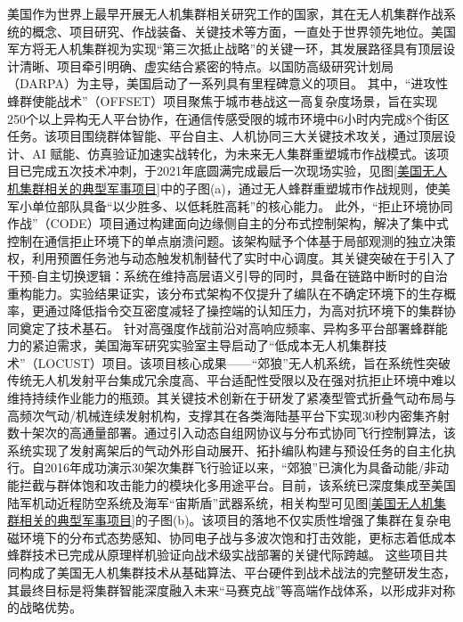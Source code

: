 美国作为世界上最早开展无人机集群相关研究工作的国家，其在无人机集群作战系统的概念、项目研究、作战装备、关键技术等方面，一直处于世界领先地位\cite{WRXT202409001016}。美国军方将无人机集群视为实现“第三次抵止战略”的关键一环，其发展路径具有顶层设计清晰、项目牵引明确、虚实结合紧密的特点\cite{zha2024smart}。以国防高级研究计划局（DARPA）为主导，美国启动了一系列具有里程碑意义的项目\cite{JSWN202005010}。
其中，“进攻性蜂群使能战术”（OFFSET）项目聚焦于城市巷战这一高复杂度场景，旨在实现250个以上异构无人平台协作，在通信传感受限的城市环境中6小时内完成8个街区任务。该项目围绕群体智能、平台自主、人机协同三大关键技术攻关，通过顶层设计、AI 赋能、仿真验证加速实战转化，为未来无人集群重塑城市作战模式。该项目已完成五次技术冲刺，于2021年底圆满完成最后一次现场实验，见图\ref{美国无人机集群相关的典型军事项目}中的子图(a)，通过无人蜂群重塑城市作战规则，使美军小单位部队具备“以少胜多、以低耗胜高耗”的核心能力\cite{KJPL202008007}。
此外，“拒止环境协同作战”（CODE）项目通过构建面向边缘侧自主的分布式控制架构，解决了集中式控制在通信拒止环境下的单点崩溃问题。该架构赋予个体基于局部观测的独立决策权，利用预置任务池与动态触发机制替代了实时中心调度。其关键突破在于引入了干预-自主切换逻辑：系统在维持高层语义引导的同时，具备在链路中断时的自治重构能力。实验结果证实，该分布式架构不仅提升了编队在不确定环境下的生存概率，更通过降低指令交互密度减轻了操控端的认知压力，为高对抗环境下的集群协同奠定了技术基石\cite{FHDD201905005}。
针对高强度作战前沿对高响应频率、异构多平台部署蜂群能力的紧迫需求，美国海军研究实验室主导启动了“低成本无人机集群技术”（LOCUST）项目。该项目核心成果——“郊狼”无人机系统，旨在系统性突破传统无人机发射平台集成冗余度高、平台适配性受限以及在强对抗拒止环境中难以维持持续作业能力的瓶颈。其关键技术创新在于研发了紧凑型管式折叠气动布局与高频次气动/机械连续发射机构，支撑其在各类海陆基平台下实现30秒内密集齐射数十架次的高通量部署。通过引入动态自组网协议与分布式协同飞行控制算法，该系统实现了发射离架后的气动外形自动展开、拓扑编队构建与预设任务的自主化执行。自2016年成功演示30架次集群飞行验证以来，“郊狼”已演化为具备动能/非动能拦截与群体饱和攻击能力的模块化多用途平台。目前，该系统已深度集成至美国陆军机动近程防空系统及海军“宙斯盾”武器系统，相关构型可见图\ref{美国无人机集群相关的典型军事项目}的子图(b)。该项目的落地不仅实质性增强了集群在复杂电磁环境下的分布式态势感知、协同电子战与多波次饱和打击效能，更标志着低成本蜂群技术已完成从原理样机验证向战术级实战部署的关键代际跨越\cite{JCGC202208001,BGZD202503021}。
这些项目共同构成了美国无人机集群技术从基础算法、平台硬件到战术战法的完整研发生态，其最终目标是将集群智能深度融入未来“马赛克战”等高端作战体系，以形成非对称的战略优势。

